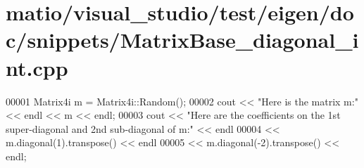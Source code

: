 \hypertarget{matio_2visual__studio_2test_2eigen_2doc_2snippets_2_matrix_base__diagonal__int_8cpp_source}{}\section{matio/visual\+\_\+studio/test/eigen/doc/snippets/\+Matrix\+Base\+\_\+diagonal\+\_\+int.cpp}
\label{matio_2visual__studio_2test_2eigen_2doc_2snippets_2_matrix_base__diagonal__int_8cpp_source}

\begin{DoxyCode}
00001 Matrix4i m = Matrix4i::Random();
00002 cout << \textcolor{stringliteral}{"Here is the matrix m:"} << endl << m << endl;
00003 cout << \textcolor{stringliteral}{"Here are the coefficients on the 1st super-diagonal and 2nd sub-diagonal of m:"} << endl
00004      << m.diagonal(1).transpose() << endl
00005      << m.diagonal(-2).transpose() << endl;
\end{DoxyCode}
